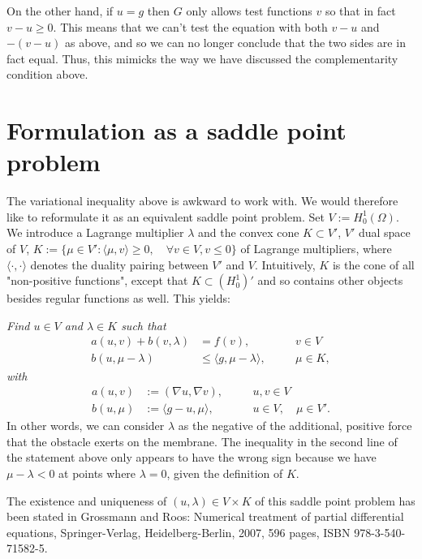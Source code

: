 \documentclass{article}
\begin{document}
On the other hand, if $u=g$ then $G$ only allows test functions $v$ so that in fact
$v-u\ge 0$. This means that we can't test the equation with both $v-u$ and
$-(v-u)$ as above, and so we can no longer conclude that the two sides are in
fact equal. Thus, this mimicks the way we have discussed the complementarity
condition above.



\section{Formulation as a saddle point problem}

The variational inequality above is awkward to work with. We would therefore
like to reformulate it as an equivalent saddle point problem. Set $V:=H^1_0(\Omega)$.
We introduce a Lagrange multiplier $\lambda$ and the convex cone $K\subset V'$, $V'$
dual space of $V$, $K:=\{\mu\in V': \langle\mu,v\rangle\geq 0,\quad \forall
v\in V, v \le 0 \}$ of
Lagrange multipliers, where $\langle\cdot,\cdot\rangle$ denotes the duality
pairing between $V'$ and $V$. Intuitively, $K$ is the cone of all "non-positive
functions", except that $K\subset (H_0^1)'$ and so contains other objects
besides regular functions as well.
This yields:

\textit{Find $u\in V$ and $\lambda\in K$ such that}
\begin{align*}
 a(u,v) + b(v,\lambda) &= f(v),\quad &&v\in V\\
 b(u,\mu - \lambda) &\leq \langle g,\mu - \lambda\rangle,\quad&&\mu\in K,
\end{align*}
\textit{with}
\begin{align*}
 a(u,v) &:= \left(\nabla u, \nabla v\right),\quad &&u,v\in V\\
 b(u,\mu) &:= \langle g-u,\mu\rangle,\quad &&u\in V,\quad\mu\in V'.
\end{align*}
In other words, we can consider $\lambda$ as the negative of the additional, positive force that the
obstacle exerts on the membrane. The inequality in the second line of the
statement above only appears to have the wrong sign because we have
$\mu-\lambda<0$ at points where $\lambda=0$, given the definition of $K$.

The existence and uniqueness of $(u,\lambda)\in V\times K$ of this saddle
point problem has been stated in Grossmann and Roos: Numerical treatment of
partial differential equations, Springer-Verlag, Heidelberg-Berlin, 2007, 596
pages, ISBN 978-3-540-71582-5.
\end{document}
